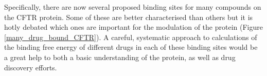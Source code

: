 Specifically, there are now several proposed binding sites for many compounds on the CFTR protein. Some of these are better characterised than others but it is hotly debated which ones are important for the modulation of the protein (Figure \ref{many_drug_bound_CFTR}). A careful, systematic approach to calculations of the binding free energy of different drugs in each of these binding sites would be a great help to both a basic understanding of the protein, as well as drug discovery efforts. 


